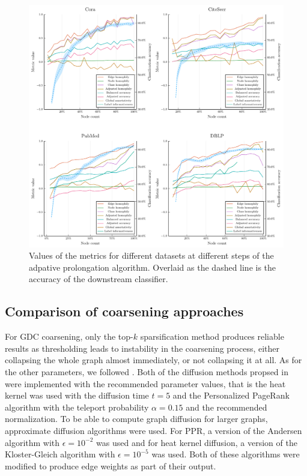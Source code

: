 \begin{figure}
  \centering
  \includegraphics[width = \linewidth]{images/metrics/metrics.pdf}
  \caption{Values of the metrics for different datasets at different steps of the adpative prolongation algorithm. Overlaid as the dashed line is the accuracy of the downstream classifier.}
  \label{fig:metrics}
\end{figure}

\subsection{Comparison of coarsening approaches}

For GDC coarsening, only the top-\( k \) sparsification method produces reliable results as thresholding leads to instability in the coarsening process, either collapsing the whole graph almost immediately, or not collapsing it at all. As for the other parameters, we followed \cite{gasteiger_diffusion_2019}. Both of the diffusion methods propsed in \cite{gasteiger_diffusion_2019} were implemented with the recommended parameter values, that is the heat kernel was used with the diffusion time \( t = 5 \) and the Personalized PageRank algorithm with the teleport probability \( \alpha = 0.15 \) and the recommended normalization. To be able to compute graph diffusion for larger graphs, approximate diffusion algorithms were used. For PPR, a version of the Andersen algorithm \cite{andersen_local_2006} with \( \epsilon = 10^{-2} \) was used and for heat kernel diffusion, a version of the Kloster-Gleich algorithm \cite{kloster_heat_2014} with \( \epsilon = 10^{-5} \) was used. Both of these algorithms were modified to produce edge weights as part of their output.

